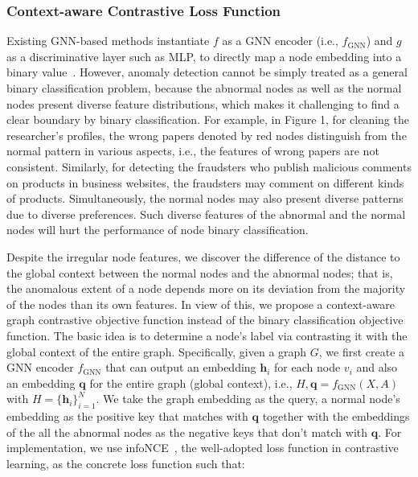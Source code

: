 {\subsubsection{Context-aware Contrastive Loss Function}
Existing GNN-based methods instantiate $f$ as a GNN encoder (i.e., $f_{\text{GNN}}$) and $g$ as a discriminative layer such as MLP, to directly map a node embedding into a binary value~\cite{dou2020enhancing,liu2020alleviating}. 
However, anomaly detection cannot be simply treated as a general binary classification problem, because the abnormal nodes as well as the normal nodes present diverse feature distributions, which makes it challenging to find a clear boundary by binary classification. 
For example, in Figure 1, for cleaning the researcher's profiles, the wrong papers denoted by red nodes distinguish from the normal pattern in various aspects, i.e., the features of wrong papers are not consistent. 
Similarly, for detecting the fraudsters who publish malicious comments on products in business websites, the fraudsters may comment on different kinds of products. 
Simultaneously, the normal nodes may also present diverse patterns due to diverse preferences. 
Such diverse features of the abnormal and the normal nodes will hurt the performance of node binary classification.

Despite the irregular node features, we discover the difference of the distance to the global context between the normal nodes and the abnormal nodes; that is, the anomalous extent of a node depends more on its deviation from the majority of the nodes than its own features.
In view of this, we propose a context-aware graph contrastive objective function instead of the binary classification objective function. The basic idea is to determine a node's label via contrasting it with the global context of the entire graph. %
Specifically, given a graph ${G}$, we first create a GNN encoder $f_{\text{GNN}}$ that can output an embedding $\boldsymbol{h}_i$ for each node $v_i$ and also an embedding $\boldsymbol{q}$ for the entire graph (global context), i.e., ${H}, \boldsymbol{q} = f_{\text{GNN}}({X}, {A})$ with $H = \{\boldsymbol{h}_i\}_{i=1}^{N}$. We take the graph embedding as the query, a normal node's embedding as the positive key that matches with $\boldsymbol{q}$ together with the embeddings of the all the abnormal nodes as the negative keys that don't match with $\boldsymbol{q}$. 
For implementation, we use infoNCE~\cite{oord2018representation}, the well-adopted loss function in contrastive learning, as the concrete loss function such that:


}
